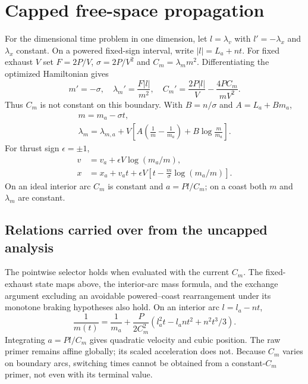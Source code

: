 \section{Capped free-space propagation}
\label{app:repair}
For the dimensional time problem in one dimension, let
$l=\lambda_v$ with $l'=-\lambda_x$ and $\lambda_x$ constant.
On a powered fixed-sign interval, write $|l|=L_a+nt$.
For fixed exhaust $V$ set $F=2P/V$, $\sigma=2P/V^2$ and
$C_m=\lambda_m m^2$. Differentiating the optimized Hamiltonian gives
\begin{equation}
 m'=-\sigma,\quad
 \lambda_m'=\frac{F|l|}{m^2},\quad
 C_m'=\frac{2P|l|}{V}-\frac{4PC_m}{mV^2}.
\end{equation}
Thus $C_m$ is not constant on this boundary. With
$B=n/\sigma$ and $A=L_a+Bm_a$,
\begin{equation}
 \begin{gathered}
 m=m_a-\sigma t,\\
 \lambda_m=\lambda_{m,a}
 +V\left[A\left(\frac1m-\frac1{m_a}\right)
                  +B\log\frac m{m_a}\right].
 \end{gathered}
\end{equation}
For thrust sign $\epsilon=\pm1$,
\begin{equation}
 \begin{split}
 v&=v_a+\epsilon V\log(m_a/m),\\
 x&=x_a+v_at+\epsilon V
                \left[t-\frac m\sigma\log(m_a/m)\right].
 \end{split}
\end{equation}
On an ideal interior arc $C_m$ is constant and $a=Pl/C_m$;
on a coast both $m$ and $\lambda_m$ are constant.

\subsection{Relations carried over from the uncapped analysis}
The pointwise selector holds when evaluated with the current $C_m$.
The fixed-exhaust state maps above, the interior-arc mass formula, and
the exchange argument excluding an avoidable powered--coast rearrangement
under its monotone braking hypotheses also hold. On an interior arc
$l=l_a-nt$,
\begin{equation}
 \frac1{m(t)}=\frac1{m_a}+\frac{P}{2C_m^2}
       (l_a^2t-l_an t^2+n^2t^3/3).
\end{equation}
Integrating $a=Pl/C_m$ gives quadratic velocity and cubic position.
The raw primer remains affine globally; its scaled acceleration does not.
Because $C_m$ varies on boundary arcs, switching times cannot be
obtained from a constant-$C_m$ primer, not even with its terminal value.

